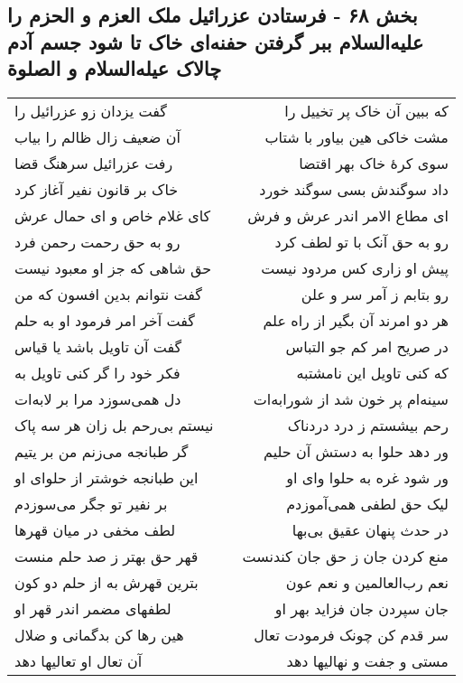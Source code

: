 \begin{center}
\section*{بخش ۶۸ - فرستادن عزرائیل ملک العزم و الحزم را علیه‌السلام ببر گرفتن  حفنه‌ای خاک تا شود جسم آدم چالاک عیله‌السلام و الصلوة}
\label{sec:sh068}
\begin{longtable}{l p{0.5cm} r}
گفت یزدان زو عزرائیل را
&&
که ببین آن خاک پر تخییل را
\\
آن ضعیف زال ظالم را بیاب
&&
مشت خاکی هین بیاور با شتاب
\\
رفت عزرائیل سرهنگ قضا
&&
سوی کرهٔ خاک بهر اقتضا
\\
خاک بر قانون نفیر آغاز کرد
&&
داد سوگندش بسی سوگند خورد
\\
کای غلام خاص و ای حمال عرش
&&
ای مطاع الامر اندر عرش و فرش
\\
رو به حق رحمت رحمن فرد
&&
رو به حق آنک با تو لطف کرد
\\
حق شاهی که جز او معبود نیست
&&
پیش او زاری کس مردود نیست
\\
گفت نتوانم بدین افسون که من
&&
رو بتابم ز آمر سر و علن
\\
گفت آخر امر فرمود او به حلم
&&
هر دو امرند آن بگیر از راه علم
\\
گفت آن تاویل باشد یا قیاس
&&
در صریح امر کم جو التباس
\\
فکر خود را گر کنی تاویل به
&&
که کنی تاویل این نامشتبه
\\
دل همی‌سوزد مرا بر لابه‌ات
&&
سینه‌ام پر خون شد از شورابه‌ات
\\
نیستم بی‌رحم بل زان هر سه پاک
&&
رحم بیشستم ز درد دردناک
\\
گر طبانجه می‌زنم من بر یتیم
&&
ور دهد حلوا به دستش آن حلیم
\\
این طبانجه خوشتر از حلوای او
&&
ور شود غره به حلوا وای او
\\
بر نفیر تو جگر می‌سوزدم
&&
لیک حق لطفی همی‌آموزدم
\\
لطف مخفی در میان قهرها
&&
در حدث پنهان عقیق بی‌بها
\\
قهر حق بهتر ز صد حلم منست
&&
منع کردن جان ز حق جان کندنست
\\
بترین قهرش به از حلم دو کون
&&
نعم رب‌العالمین و نعم عون
\\
لطفهای مضمر اندر قهر او
&&
جان سپردن جان فزاید بهر او
\\
هین رها کن بدگمانی و ضلال
&&
سر قدم کن چونک فرمودت تعال
\\
آن تعال او تعالیها دهد
&&
مستی و جفت و نهالیها دهد

\end{longtable}
\end{center}
